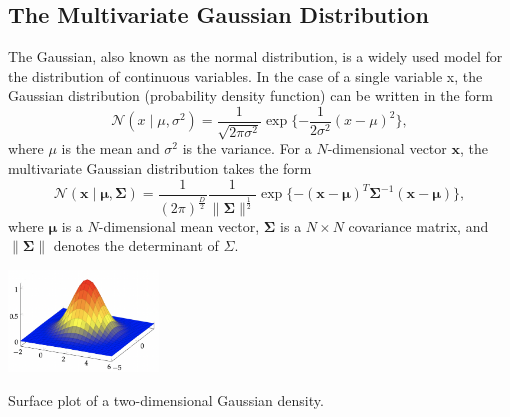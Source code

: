 \documentclass{tufte-handout}
\begin{document}
\subsection{The Multivariate Gaussian Distribution}

The Gaussian, also known as the normal distribution, is a widely used model for the distribution of continuous variables. In the case of a single variable x, the Gaussian distribution (probability density function) can be written in the form
  \begin{equation*}
 \mathcal{N}(x \mid\mu,\sigma^2)  = \frac{1}{\sqrt{2\pi\sigma^2}} \exp\{-\frac{1}{2\sigma^2} (x-\mu)^2\},
  \end{equation*}
where $\mu$ is the mean and $\sigma^2$ is the variance. For a $N$-dimensional vector $\mathbf x$, the multivariate Gaussian distribution takes the form
  \begin{equation*}
 \mathcal{N}(\mathbf x \mid \boldsymbol \mu,\mathbf \Sigma)  = \frac{1}{(2\pi)^{\frac{D}{2}}} 
 \frac{1}{\|\boldsymbol \Sigma\|^{\frac{1}{2}}}   \exp\{-(\mathbf x-\boldsymbol \mu)^T\boldsymbol \Sigma^{-1} (\mathbf x-\boldsymbol \mu)\},
  \end{equation*}
where $\boldsymbol \mu$ is a $N$-dimensional mean vector, $\boldsymbol \Sigma$ is a $N \times N$ covariance matrix, and $\|\boldsymbol \Sigma\|$ denotes the determinant of $\Sigma$.



\begin{marginfigure}
\centering
\includegraphics[width=4cm]{fig/G2D.png}
\caption{Surface plot of a two-dimensional Gaussian density.
}
\end{marginfigure}


\end{document}

